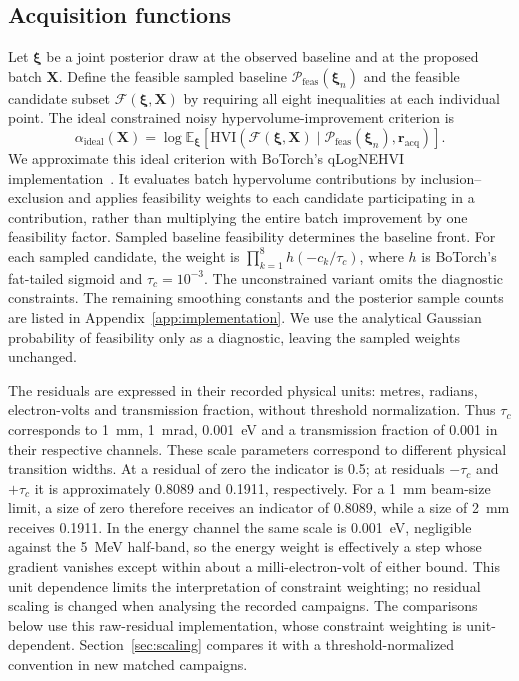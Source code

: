 \documentclass[aps,prab,reprint,superscriptaddress,amsmath,amssymb,floatfix]{revtex4-2}
\begin{document}
\subsection{Acquisition functions}
\label{sec:acquisition}
Let $\boldsymbol{\xi}$ be a joint posterior draw at the observed baseline and
at the proposed batch $\mathbf{X}$. Define the feasible sampled baseline
$\mathcal{P}_{\mathrm{feas}}(\boldsymbol{\xi}_n)$ and the feasible candidate
subset $\mathcal{F}(\boldsymbol{\xi},\mathbf{X})$ by requiring all eight
inequalities at each individual point. The ideal constrained noisy
hypervolume-improvement criterion is
\begin{equation}
 \alpha_{\mathrm{ideal}}(\mathbf{X})=
 \log\mathbb{E}_{\boldsymbol{\xi}}\!\left[
 \mathrm{HVI}\!\left(\mathcal{F}(\boldsymbol{\xi},\mathbf{X})\mid
 \mathcal{P}_{\mathrm{feas}}(\boldsymbol{\xi}_n),\mathbf{r}_{\mathrm{acq}}\right)
 \right].
 \label{eq:qlognehvi}
\end{equation}
We approximate this ideal criterion with BoTorch's qLogNEHVI
implementation~\cite{Daulton2021,Ament2023}. It evaluates batch
hypervolume contributions by inclusion--exclusion and applies feasibility
weights to each candidate participating in a contribution, rather than
multiplying the entire batch improvement by one feasibility factor. Sampled
baseline feasibility determines the baseline front. For each sampled candidate,
the weight is $\prod_{k=1}^{8}h(-c_k/\tau_c)$, where $h$ is BoTorch's
fat-tailed sigmoid and $\tau_c=10^{-3}$. The unconstrained variant omits the diagnostic
constraints. The remaining smoothing constants and the posterior sample counts are listed in
Appendix~\ref{app:implementation}. We use the analytical Gaussian probability of feasibility only as
a diagnostic, leaving the
sampled weights unchanged.

The residuals are expressed in their recorded physical units: metres, radians, electron-volts
and transmission fraction, without threshold normalization. Thus $\tau_c$ corresponds to
\SI{1}{\milli\metre}, \SI{1}{\milli\radian}, \SI{0.001}{\electronvolt} and a transmission
fraction of 0.001 in their respective channels. These scale parameters correspond to different
physical transition widths. At a residual of zero the indicator is 0.5; at residuals $-\tau_c$
and $+\tau_c$ it is approximately 0.8089 and 0.1911, respectively. For a \SI{1}{\milli\metre}
beam-size limit, a size of zero therefore receives an indicator of 0.8089, while a size of
\SI{2}{\milli\metre} receives 0.1911. In the energy channel the same scale is
\SI{0.001}{\electronvolt}, negligible against the \SI{5}{\mega\electronvolt} half-band, so the
energy weight is effectively a step whose gradient vanishes except within about a
milli-electron-volt of either bound. This unit dependence limits the interpretation of
constraint weighting; no residual scaling is changed when analysing the recorded campaigns. The
comparisons below use this raw-residual implementation, whose constraint weighting is
unit-dependent. Section~\ref{sec:scaling} compares it with a threshold-normalized convention in
new matched campaigns.
\end{document}
